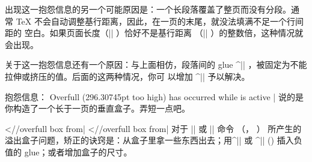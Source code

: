 
出现这一抱怨信息的另一个可能原因是：一个长段落覆盖了整页而没有分段。通
常 \TeX{} 不会自动调整基行距离，因此，在一页的末尾，就没法填满不足一个行间距的
空白。如果页面长度（|\vsize| \ctsref{\vsize}）恰好不是基行距离
（|\baselineskip| \ctsref{\baselineskip}）的整数倍，这种情况就会出现。


关于这一抱怨信息还有一个原因：与上面相仿，段落间的 glue ^|\parskip|
\ctsref{\parskip}，被固定为不能拉伸或挤压的值。后面的这两种情况，你可
以增加 ^|\vfuzz| \ctsref\vfuzz 予以解决。


\li 抱怨信息：
\csdisplay
Overfull \vbox (296.30745pt too high) has occurred
   while \output is active
|
说的是你构造了一个长于一页的垂直盒子。弄短一点吧。


\li 
\bix^^|\hbox//overfull box from|
\bix^^|\vbox//overfull box from|
对于 |\hbox| 或 |\vbox| 命令 （\pp\xrefn\hbox， \xrefn\vbox） 所产生的
溢出盒子问题，矫正的诀窍是：从盒子里拿一些东西出去；用^|\hss| 或 ^|\vss| (\xref\hss)
插入负值的 glue；或者增加盒子的尺寸。


